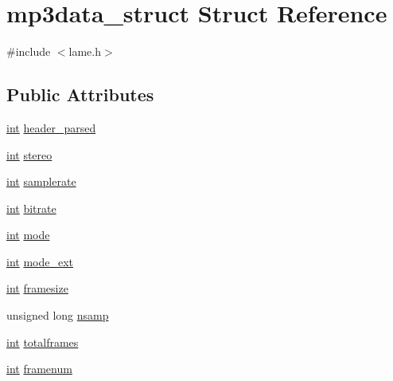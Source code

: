 \hypertarget{structmp3data__struct}{}\section{mp3data\+\_\+struct Struct Reference}
\label{structmp3data__struct}


{\ttfamily \#include $<$lame.\+h$>$}

\subsection*{Public Attributes}
\begin{DoxyCompactItemize}
\item 
\hyperlink{xmltok_8h_a5a0d4a5641ce434f1d23533f2b2e6653}{int} \hyperlink{structmp3data__struct_ab5a8987eae86e58b60d6e2d8669d1bdc}{header\+\_\+parsed}
\item 
\hyperlink{xmltok_8h_a5a0d4a5641ce434f1d23533f2b2e6653}{int} \hyperlink{structmp3data__struct_ac315000298eb2b2312675d1c748dcd57}{stereo}
\item 
\hyperlink{xmltok_8h_a5a0d4a5641ce434f1d23533f2b2e6653}{int} \hyperlink{structmp3data__struct_a3289009b10c31e9890e4759cb26fb96b}{samplerate}
\item 
\hyperlink{xmltok_8h_a5a0d4a5641ce434f1d23533f2b2e6653}{int} \hyperlink{structmp3data__struct_aa3df8d515c5f2a1452da71c720831c84}{bitrate}
\item 
\hyperlink{xmltok_8h_a5a0d4a5641ce434f1d23533f2b2e6653}{int} \hyperlink{structmp3data__struct_aebadc1b792213403a8f18f2fe386d633}{mode}
\item 
\hyperlink{xmltok_8h_a5a0d4a5641ce434f1d23533f2b2e6653}{int} \hyperlink{structmp3data__struct_a7cfd50e454b886ee5426ddc6b684d7da}{mode\+\_\+ext}
\item 
\hyperlink{xmltok_8h_a5a0d4a5641ce434f1d23533f2b2e6653}{int} \hyperlink{structmp3data__struct_ace17958ccd3aac5df08568ab1a224063}{framesize}
\item 
unsigned long \hyperlink{structmp3data__struct_a5353f369d023b277619e5c05c432f015}{nsamp}
\item 
\hyperlink{xmltok_8h_a5a0d4a5641ce434f1d23533f2b2e6653}{int} \hyperlink{structmp3data__struct_af16dae72aa0006605b45f3e8093ff6be}{totalframes}
\item 
\hyperlink{xmltok_8h_a5a0d4a5641ce434f1d23533f2b2e6653}{int} \hyperlink{structmp3data__struct_a6a8024612331fe1bc8932a322d85cefb}{framenum}
\end{DoxyCompactItemize}


